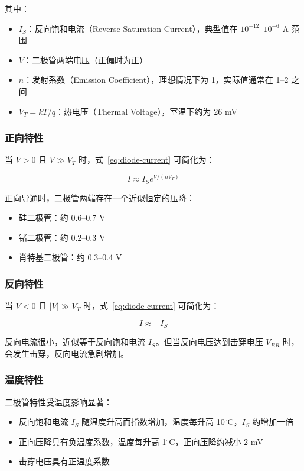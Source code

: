 其中：
\begin{itemize}
  \item $I_S$：反向饱和电流（Reverse Saturation Current），典型值在 $10^{-12}$--$10^{-6}$ A 范围
  \item $V$：二极管两端电压（正偏时为正）
  \item $n$：发射系数（Emission Coefficient），理想情况下为 1，实际值通常在 1--2 之间
  \item $V_T = kT/q$：热电压（Thermal Voltage），室温下约为 26 mV
\end{itemize}

\subsubsection{正向特性}

当 $V > 0$ 且 $V \gg V_T$ 时，式~\ref{eq:diode-current} 可简化为：

\begin{equation}
I \approx I_S e^{V/(nV_T)} \label{eq:diode-forward}
\end{equation}

正向导通时，二极管两端存在一个近似恒定的压降：
\begin{itemize}
  \item 硅二极管：约 0.6--0.7 V
  \item 锗二极管：约 0.2--0.3 V
  \item 肖特基二极管：约 0.3--0.4 V
\end{itemize}

\subsubsection{反向特性}

当 $V < 0$ 且 $|V| \gg V_T$ 时，式~\ref{eq:diode-current} 可简化为：

\begin{equation}
I \approx -I_S \label{eq:diode-reverse}
\end{equation}

反向电流很小，近似等于反向饱和电流 $I_S$。但当反向电压达到击穿电压 $V_{BR}$ 时，会发生击穿，反向电流急剧增加。

\subsubsection{温度特性}

二极管特性受温度影响显著：

\begin{itemize}
  \item 反向饱和电流 $I_S$ 随温度升高而指数增加，温度每升高 10$^\circ$C，$I_S$ 约增加一倍
  \item 正向压降具有负温度系数，温度每升高 1$^\circ$C，正向压降约减小 2 mV
  \item 击穿电压具有正温度系数
\end{itemize}

